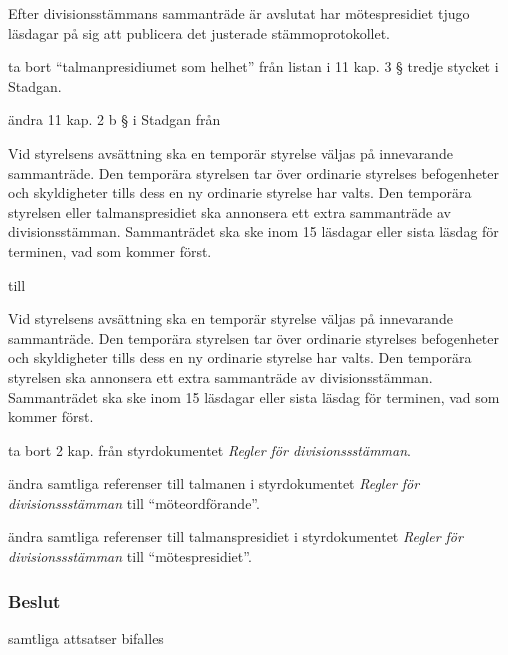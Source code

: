 \documentclass[protokoll]{dvd}
\begin{document}
\begin{attsatser}
	\begin{displayquote}
		Efter divisionsstämmans sammanträde är avslutat har mötespresidiet tjugo läsdagar på sig att publicera det justerade stämmoprotokollet.
	\end{displayquote}

	\item ta bort ``talmanpresidiumet som helhet'' från listan i 11 kap. 3 § tredje stycket i Stadgan.

	\item ändra 11 kap. 2 b § i Stadgan från

	\begin{displayquote}
		Vid styrelsens avsättning ska en temporär styrelse väljas på innevarande sammanträde.
		Den temporära styrelsen tar över ordinarie styrelses befogenheter och skyldigheter tills dess en ny ordinarie styrelse har valts.
		Den temporära styrelsen eller talmanspresidiet ska annonsera ett extra sammanträde av divisionsstämman.
		Sammanträdet ska ske inom 15 läsdagar eller sista läsdag för terminen, vad som kommer först.
	\end{displayquote}

	till

	\begin{displayquote}
		Vid styrelsens avsättning ska en temporär styrelse väljas på innevarande sammanträde.
		Den temporära styrelsen tar över ordinarie styrelses befogenheter och skyldigheter tills dess en ny ordinarie styrelse har valts.
		Den temporära styrelsen ska annonsera ett extra sammanträde av divisionsstämman.
		Sammanträdet ska ske inom 15 läsdagar eller sista läsdag för terminen, vad som kommer först.
	\end{displayquote}

	\item ta bort 2 kap. från styrdokumentet \emph{Regler för divisionssstämman}.

	\item ändra samtliga referenser till talmanen i styrdokumentet \emph{Regler för divisionssstämman} till ``möteordförande''.

	\item ändra samtliga referenser till talmanspresidiet i styrdokumentet \emph{Regler för divisionssstämman} till ``mötespresidiet''.
\end{attsatser}


\subsubsection*{Beslut}
    \begin{attsatser}
        \item samtliga attsatser bifalles
    \end{attsatser}
\end{document}
